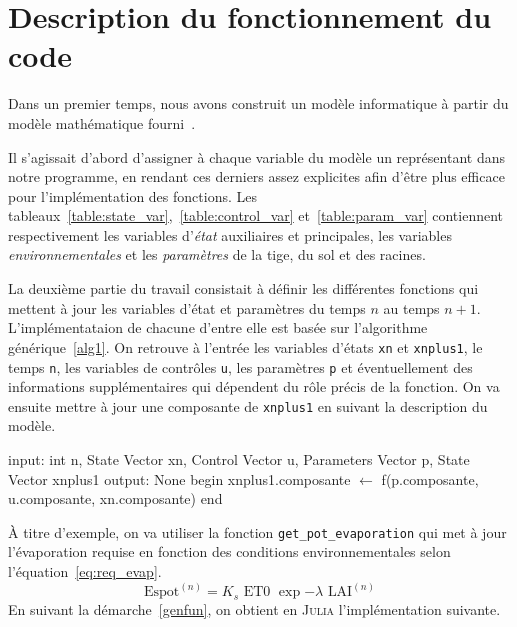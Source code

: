 \section{Description du fonctionnement du code}
Dans un premier temps, nous avons construit un modèle informatique à partir
du modèle mathématique fourni~\cite{lnas_model_wheat}.

Il s'agissait d'abord d'assigner à chaque variable du modèle un représentant
dans notre programme, en rendant ces derniers assez explicites
afin d'être plus efficace pour l'implémentation des fonctions.
Les tableaux~\ref{table:state_var},~\ref{table:control_var} et~\ref{table:param_var}
contiennent respectivement les variables d'\emph{état} auxiliaires et principales, 
les variables \emph{environnementales} et les \emph{paramètres} de la tige, du sol et des racines.



La deuxième partie du travail consistait à définir les différentes fonctions
qui mettent à jour les variables d'état et paramètres du 
temps $n$ au temps $n+1$.
L'implémentataion de chacune d'entre elle est basée sur l'algorithme générique~\ref{alg1}.
On retrouve à l'entrée les variables d'états \texttt{xn} et \texttt{xnplus1},
le temps \texttt{n}, les variables de contrôles \texttt{u}, les paramètres \texttt{p}
et éventuellement des informations supplémentaires qui dépendent
du rôle précis de la fonction.
On va ensuite mettre à jour une composante de \lstinline|xnplus1| en suivant la description du modèle.

\begin{algorithm}[caption={Algorithme générique qui sert de base pour l'implémentation
  des fonctions. La fonction $f$ n'est pas définie mais sert de placeholder
  pour représenter les opérations nécessaires à la mise à jour de xnplus1.}, label={genfun}]
 input: int n, State Vector xn, Control Vector u, Parameters Vector p, State Vector xnplus1
 output: None
 begin
   xnplus1.composante $\gets$ f(p.composante, u.composante, xn.composante)
 end       
\end{algorithm}

À titre d'exemple, on va utiliser la fonction \texttt{get\_pot\_evaporation} qui met
à jour l'évaporation requise en fonction des conditions environnementales
selon l'équation~\ref{eq:req_evap}.
\begin{equation}
  \text{Espot}^{(n)} = K_s \text{ ET0 } \exp{-\lambda \text{ LAI}^{(n)}}
  \label{eq:req_evap}
\end{equation}
En suivant la démarche~\ref{genfun}, on obtient en \textsc{Julia}
l'implémentation suivante.


